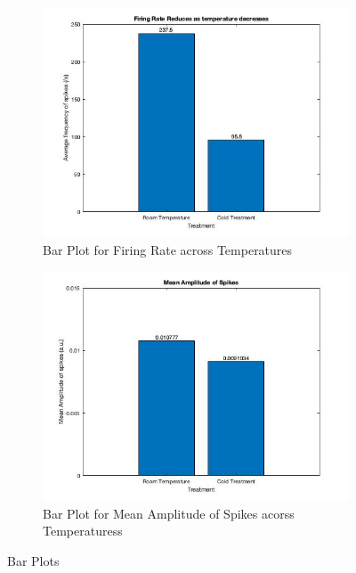 \documentclass{article}
\begin{document}
\begin{figure}[h!]
  \centering
  \begin{subfigure}{0.45\linewidth}
    \includegraphics[width=\linewidth]{Firing_Temp.jpg}
    \caption{Bar Plot for Firing Rate across Temperatures}
  \end{subfigure}
  \begin{subfigure}{0.45\linewidth}
    \includegraphics[width=\linewidth]{Mean_Temp.jpg}
    \caption{Bar Plot for Mean Amplitude of Spikes acorss Temperaturess}
  \end{subfigure}
  \caption{Bar Plots}
  \label{fig:pharma}
\end{figure}
\end{document}
